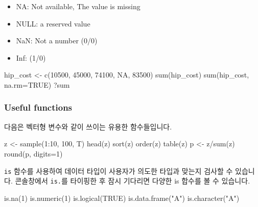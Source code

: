 \documentclass[
]{book}
\newenvironment{Shaded}{\begin{snugshade}}{\end{snugshade}}
\newcommand{\AttributeTok}[1]{\textcolor[rgb]{0.77,0.63,0.00}{#1}}
\newcommand{\ConstantTok}[1]{\textcolor[rgb]{0.00,0.00,0.00}{#1}}
\newcommand{\DecValTok}[1]{\textcolor[rgb]{0.00,0.00,0.81}{#1}}
\newcommand{\FunctionTok}[1]{\textcolor[rgb]{0.00,0.00,0.00}{#1}}
\newcommand{\NormalTok}[1]{#1}
\newcommand{\OtherTok}[1]{\textcolor[rgb]{0.56,0.35,0.01}{#1}}
\newcommand{\SpecialCharTok}[1]{\textcolor[rgb]{0.00,0.00,0.00}{#1}}
\newcommand{\StringTok}[1]{\textcolor[rgb]{0.31,0.60,0.02}{#1}}
\providecommand{\tightlist}{%
  \setlength{\itemsep}{0pt}\setlength{\parskip}{0pt}}
\begin{document}
\begin{itemize}
\tightlist
\item
  NA: Not available, The value is missing
\item
  NULL: a reserved value
\item
  NaN: Not a number (0/0)
\item
  Inf: (1/0)
\end{itemize}

\begin{Shaded}
\begin{Highlighting}[]
\NormalTok{hip\_cost }\OtherTok{\textless{}{-}} \FunctionTok{c}\NormalTok{(}\DecValTok{10500}\NormalTok{, }\DecValTok{45000}\NormalTok{, }\DecValTok{74100}\NormalTok{, }\ConstantTok{NA}\NormalTok{, }\DecValTok{83500}\NormalTok{)}
\FunctionTok{sum}\NormalTok{(hip\_cost)}
\FunctionTok{sum}\NormalTok{(hip\_cost, }\AttributeTok{na.rm=}\ConstantTok{TRUE}\NormalTok{)}
\NormalTok{?sum}
\end{Highlighting}
\end{Shaded}

\hypertarget{useful-functions}{%
\subsubsection{Useful functions}\label{useful-functions}}

다음은 벡터형 변수와 같이 쓰이는 유용한 함수들입니다.

\begin{Shaded}
\begin{Highlighting}[]
\NormalTok{z }\OtherTok{\textless{}{-}} \FunctionTok{sample}\NormalTok{(}\DecValTok{1}\SpecialCharTok{:}\DecValTok{10}\NormalTok{, }\DecValTok{100}\NormalTok{, T)}
\FunctionTok{head}\NormalTok{(z)}
\FunctionTok{sort}\NormalTok{(z)}
\FunctionTok{order}\NormalTok{(z)}
\FunctionTok{table}\NormalTok{(z)}
\NormalTok{p }\OtherTok{\textless{}{-}}\NormalTok{ z}\SpecialCharTok{/}\FunctionTok{sum}\NormalTok{(z)}
\FunctionTok{round}\NormalTok{(p, }\AttributeTok{digits=}\DecValTok{1}\NormalTok{)}
\end{Highlighting}
\end{Shaded}

\texttt{is} 함수를 사용하여 데이터 타입이 사용자가 의도한 타입과 맞는지 검사할 수 있습니다. 콘솔창에서 \texttt{is.}를 타이핑한 후 잠시 기다리면 다양한 is 합수를 볼 수 있습니다.

\begin{Shaded}
\begin{Highlighting}[]
\FunctionTok{is.na}\NormalTok{(}\DecValTok{1}\NormalTok{)}
\FunctionTok{is.numeric}\NormalTok{(}\DecValTok{1}\NormalTok{)}
\FunctionTok{is.logical}\NormalTok{(}\ConstantTok{TRUE}\NormalTok{)}
\FunctionTok{is.data.frame}\NormalTok{(}\StringTok{"A"}\NormalTok{)}
\FunctionTok{is.character}\NormalTok{(}\StringTok{"A"}\NormalTok{)}
\end{Highlighting}
\end{Shaded}
\end{document}
